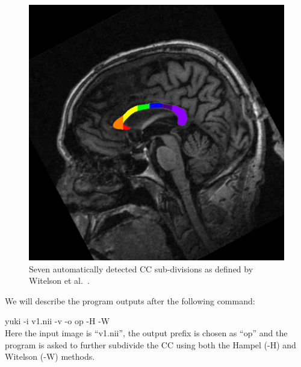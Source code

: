 \documentclass[11pt]{article}
\begin{document}
\begin{figure}[H]
\begin{center}
\includegraphics[scale=.5]{v1_cc_witelson.jpg}
\caption{Seven automatically detected CC sub-divisions as defined by Witelson et al.\ 
\citep{Narayan2016-es}.
}
\label{fig:witelson}
\end{center}
\end{figure}


\noindent We will describe the program outputs after the following command:

yuki -i v1.nii -v -o op -H -W \\
Here the input image is ``v1.nii'', the output prefix is chosen as ``op'' and the
program is asked to further subdivide the CC using both the Hampel (-H) and Witelson (-W)
methods.
\end{document}
